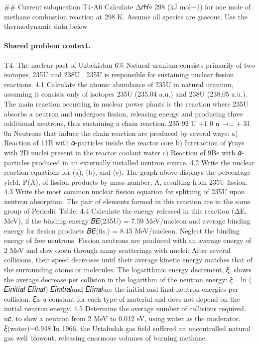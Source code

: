 \#\# Current subquestion T4-A6
Calculate Δ𝑟𝐻∘ 298 (kJ mol−1) for one mole of methane combustion reaction at 298 K. Assume all species are gaseous. Use the thermodynamic data below

\paragraph{Shared problem context.}
T4. The nuclear past of Uzbekistan 6\% Natural uranium consists primarily of two isotopes, 235U and 238U . 235U is responsible for sustaining nuclear fission reactions. 4.1 Calculate the atomic abundance of 235U in natural uranium, assuming it consists only of isotopes 235U (235.04 a.u.) and 238U (238.05 a.u.). The main reaction occurring in nuclear power plants is the reaction where 235U absorbs a neutron and undergoes fission, releasing energy and producing three additional neutrons, thus sustaining a chain reaction. 235 92 U +1 0 n →… + 31 0n Neutrons that induce the chain reaction are produced by several ways: a) Reaction of 11B with 𝛼-particles inside the reactor core b) Interaction of 𝛾rays with 2D nuclei present in the reactor coolant water c) Reaction of 9Be with 𝛼-particles produced in an externally installed neutron source. 4.2 Write the nuclear reaction equations for (a), (b), and (c). The graph above displays the percentage yield, P(A), of fission products by mass number, A, resulting from 235U fission. 4.3 Write the most common nuclear fission equation for splitting of 235U upon neutron absorption. The pair of elements formed in this reaction are in the same group of Periodic Table. 4.4 Calculate the energy released in this reaction (ΔE, MeV), if the binding energy 𝐵𝐸(235U) = 7.59 MeV/nucleon and average binding energy for fission products 𝐵𝐸(fis.) = 8.45 MeV/nucleon. Neglect the binding energy of free neutrons. Fission neutrons are produced with an average energy of 2 MeV and slow down through many scatterings with nuclei. After several collisions, their speed decreases until their average kinetic energy matches that of the surrounding atoms or molecules. The logarithmic energy decrement, 𝜉, shows the average decrease per collision in the logarithm of the neutron energy: 𝜉= ln ( 𝐸𝑖𝑛𝑖𝑡𝑖𝑎𝑙 𝐸𝑓𝑖𝑛𝑎𝑙) 𝐸𝑖𝑛𝑖𝑡𝑖𝑎𝑙and 𝐸𝑓𝑖𝑛𝑎𝑙are the initial and final neutron energies per collision. 𝜉is a constant for each type of material and does not depend on the initial neutron energy. 4.5 Determine the average number of collisions required, n𝑐, to slow a neutron from 2 MeV to 0.012 eV, using water as the moderator. 𝜉(water)=0.948 In 1966, the Urtabulak gas field suffered an uncontrolled natural gas well blowout, releasing enormous volumes of burning methane.

